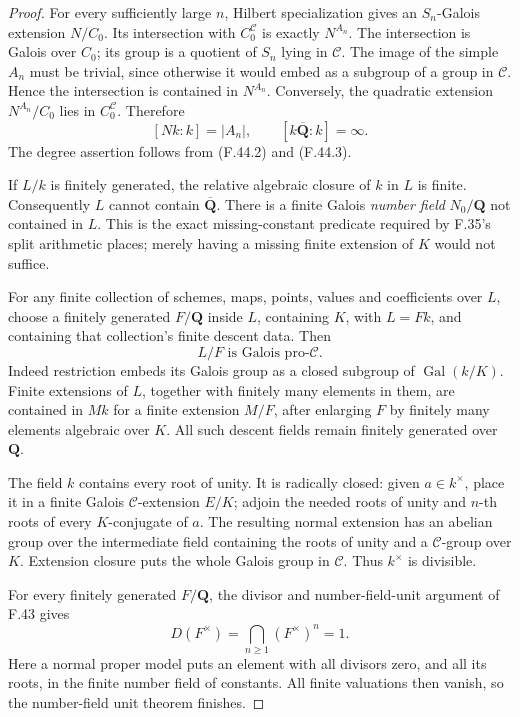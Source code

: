 \begin{proof}
For every sufficiently large \(n\), Hilbert specialization gives an \(S_n\)-Galois extension \(N/C_0\). Its intersection with \(C_0^{\mathcal C}\) is exactly \(N^{A_n}\). The intersection is Galois over \(C_0\); its group is a quotient of \(S_n\) lying in \(\mathcal C\). The image of the simple \(A_n\) must be trivial, since otherwise it would embed as a subgroup of a group in \(\mathcal C\). Hence the intersection is contained in \(N^{A_n}\). Conversely, the quadratic extension \(N^{A_n}/C_0\) lies in \(C_0^{\mathcal C}\). Therefore
\[
 [Nk:k]=|A_n|,\qquad [k\overline{\mathbf Q}:k]=\infty.
 \tag{F.44.4}
\]
The degree assertion follows from \textup{(F.44.2)} and \textup{(F.44.3)}.

If \(L/k\) is finitely generated, the relative algebraic closure of \(k\) in \(L\) is finite. Consequently \(L\) cannot contain \(\overline{\mathbf Q}\). There is a finite Galois \emph{number field} \(N_0/\mathbf Q\) not contained in \(L\). This is the exact missing-constant predicate required by F.35's split arithmetic places; merely having a missing finite extension of \(K\) would not suffice.

For any finite collection of schemes, maps, points, values and coefficients over \(L\), choose a finitely generated \(F/\mathbf Q\) inside \(L\), containing \(K\), with \(L=Fk\), and containing that collection's finite descent data. Then
\[
           L/F\text{ is Galois pro-}\mathcal C.
 \tag{F.44.5}
\]
Indeed restriction embeds its Galois group as a closed subgroup of \(\operatorname{Gal}(k/K)\). Finite extensions of \(L\), together with finitely many elements in them, are contained in \(Mk\) for a finite extension \(M/F\), after enlarging \(F\) by finitely many elements algebraic over \(K\). All such descent fields remain finitely generated over \(\mathbf Q\).


The field \(k\) contains every root of unity. It is radically closed: given \(a\in k^\times\), place it in a finite Galois \(\mathcal C\)-extension \(E/K\); adjoin the needed roots of unity and \(n\)-th roots of every \(K\)-conjugate of \(a\). The resulting normal extension has an abelian group over the intermediate field containing the roots of unity and a \(\mathcal C\)-group over \(K\). Extension closure puts the whole Galois group in \(\mathcal C\). Thus \(k^\times\) is divisible.

For every finitely generated \(F/\mathbf Q\), the divisor and number-field-unit argument of F.43 gives
\[
                 D(F^\times)=\bigcap_{n\ge1}(F^\times)^n=1.
 \tag{F.44.6}
\]
Here a normal proper model puts an element with all divisors zero, and all its roots, in the finite number field of constants. All finite valuations then vanish, so the number-field unit theorem finishes.


\end{proof}
